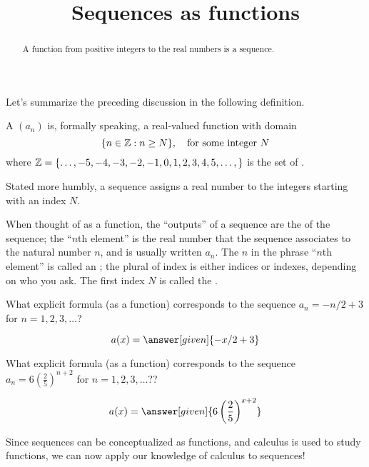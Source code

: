 \documentclass{ximera}
\title[Dig-In:]{Sequences as functions}
\begin{document}
\begin{abstract}
  A function from positive integers to the real numbers is a sequence.
\end{abstract}
\maketitle

Let's summarize the preceding discussion in the following definition.
\begin{definition}
  A  $(a_n)$ is, formally speaking, a real-valued
  function with domain
  \[
  \{ n \in \mathbb Z : n \ge N \},\quad \text{for some integer $N$}
  \]
  where $\mathbb Z = \{\dots, -5,-4,-3,-2,-1,0,1,2,3,4,5,\dots,\}$ is the set
  of .
\end{definition}

Stated more humbly, a sequence assigns a real number to the integers
starting with an index $N$.

When thought of as a function, the ``outputs'' of a sequence are the
 of the sequence; the ``$n$th element'' is the real
number that the sequence associates to the natural number $n$, and is
usually written $a_n$.  The $n$ in the phrase
``$n$th element'' is called an ; the
plural of index is either indices or indexes, depending on who you
ask.  The first index $N$ is called the .

\begin{question}
  What explicit formula (as a function) corresponds to the sequence
  $a_n = -n/2+3$ for $n=1,2,3,\dots$?
  \begin{prompt}
    \[
    a(x) = \answer[given]{-x/2 + 3}
    \]
  \end{prompt}
\end{question}

\begin{question}
  What explicit formula (as a function) corresponds to the sequence
  $a_n = 6\left(\frac{2}{5}\right)^{n+2}$ for $n=1,2,3,\dots$??
  \begin{prompt}
    \[
    a(x) = \answer[given]{6\left(\frac{2}{5}\right)^{x+2}}
    \]
  \end{prompt}
\end{question}


Since sequences can be conceptualized as functions, and calculus is
used to study functions, we can now apply our knowledge of calculus to
sequences!
\end{document}
